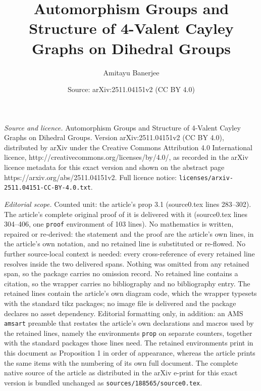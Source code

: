\documentclass[10pt,a4paper]{amsart}
\title{Automorphism Groups and Structure of 4-Valent Cayley Graphs on Dihedral Groups}
\author{Amitayu Banerjee}
\date{Source: arXiv:2511.04151v2 (CC BY 4.0)}
\begin{document}
\maketitle

\noindent\emph{Source and licence.} Automorphism Groups and Structure of 4-Valent Cayley Graphs on Dihedral Groups. Version arXiv:2511.04151v2 (CC BY 4.0), distributed by arXiv under the Creative Commons Attribution 4.0 International licence, http://creativecommons.org/licenses/by/4.0/, as recorded in the arXiv licence metadata for this exact version and shown on the abstract page https://arxiv.org/abs/2511.04151v2. Full licence notice: \texttt{licenses/arxiv-2511.04151-CC-BY-4.0.txt}.\par\smallskip

\noindent\textit{Editorial scope.} Counted unit: the article's prop 3.1 (source0.tex lines 283--302). The article's complete original proof of it is delivered with it (source0.tex lines 304--406, one \texttt{proof} environment of 103 lines). No mathematics is written, repaired or re-derived: the statement and the proof are the article's own lines, in the article's own notation, and no retained line is substituted or re-flowed.  No further source-local context is needed: every cross-reference of every retained line resolves inside the two delivered spans.  Nothing was omitted from any retained span, so the package carries no omission record.  No retained line contains a citation, so the wrapper carries no bibliography and no bibliography entry.  The retained lines contain the article's own diagram code, which the wrapper typesets with the standard tikz packages; no image file is delivered and the package declares no asset dependency.  Editorial formatting only, in addition: an AMS \texttt{amsart} preamble that restates the article's own declarations and macros used by the retained lines, namely the environments \texttt{prop} on separate counters, together with the standard packages those lines need.  The retained environments print in this document as Proposition 1 in order of appearance, whereas the article prints the same items with the numbering of its own full document.  The complete native source of the article as distributed in the arXiv e-print for this exact version is bundled unchanged as \texttt{sources/188565/source0.tex}.
\end{document}
